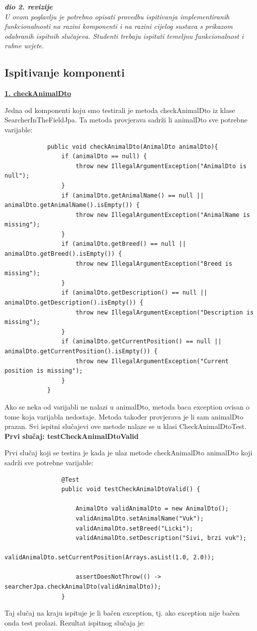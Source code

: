 			\textbf{\textit{dio 2. revizije}}\\
			
			 \textit{U ovom poglavlju je potrebno opisati provedbu ispitivanja implementiranih funkcionalnosti na razini komponenti i na razini cijelog sustava s prikazom odabranih ispitnih slučajeva. Studenti trebaju ispitati temeljnu funkcionalnost i rubne uvjete.}
	
			
			\subsection{Ispitivanje komponenti}
			\underline{\textbf{1. checkAnimalDto}}
			
			Jedna od komponenti koju smo testirali je metoda checkAnimalDto iz klase SearcherInTheFieldJpa. Ta metoda provjerava sadrži li animalDto sve potrebne varijable:
			\begin{lstlisting}
			public void checkAnimalDto(AnimalDto animalDto){
				if (animalDto == null) {
					throw new IllegalArgumentException("AnimalDto is null");
				}
				if (animalDto.getAnimalName() == null || animalDto.getAnimalName().isEmpty()) {
					throw new IllegalArgumentException("AnimalName is missing");
				}
				if (animalDto.getBreed() == null || animalDto.getBreed().isEmpty()) {
					throw new IllegalArgumentException("Breed is missing");
				}
				if (animalDto.getDescription() == null || animalDto.getDescription().isEmpty()) {
					throw new IllegalArgumentException("Description is missing");
				}
				if (animalDto.getCurrentPosition() == null || animalDto.getCurrentPosition().isEmpty()) {
					throw new IllegalArgumentException("Current position is missing");
				}
			}
			\end{lstlisting}
			Ako se neka od varijabli ne nalazi u animalDto, metoda baca exception ovisan o tome koja varijabla nedostaje. Metoda također provjerava je li sam animalDto prazan. Svi ispitni slučajevi ove metode nalaze se u klasi CheckAnimalDtoTest.\\
			
			\noindent\textbf{Prvi slučaj: testCheckAnimalDtoValid}
			
			Prvi slučaj koji se testira je kada je ulaz metode checkAnimalDto animalDto koji sadrži sve potrebne varijable:
			\begin{lstlisting}
				@Test
				public void testCheckAnimalDtoValid() {
					
					AnimalDto validAnimalDto = new AnimalDto();
					validAnimalDto.setAnimalName("Vuk");
					validAnimalDto.setBreed("Licki");
					validAnimalDto.setDescription("Sivi, brzi vuk");
					validAnimalDto.setCurrentPosition(Arrays.asList(1.0, 2.0));
					
					assertDoesNotThrow(() -> searcherJpa.checkAnimalDto(validAnimalDto));
				}
			\end{lstlisting}
			Taj slučaj na kraju ispituje je li bačen exception, tj. ako exception nije bačen onda test prolazi. Rezultat ispitnog slučaja je:
			
